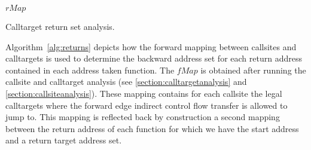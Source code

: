 \begin{algorithm}[!ht]
        \footnotesize
	\SetAlgoLined
        \BlankLine
	{
	
 	
        
        
	\Return $rMap$\;                         

	}
\caption{Calltarget return set analysis.}
\label{alg:returns}
\end{algorithm}

Algorithm~\ref{alg:returns} depicts how the forward mapping between 
callsites and calltargets is used to determine the backward address set 
for each return address contained in each address taken function. The 
$fMap$ is obtained after running the callsite and 
calltarget analysis (see \cref{section:calltargetanalysis} and \cref{section:callsiteanalysis}). 
These mapping contains for each callsite the legal calltargets where the forward edge
indirect control flow transfer is allowed to jump to. This mapping is reflected back by construction a second
mapping between the return address of each function for which we have the start 
address and a return target address set. 

